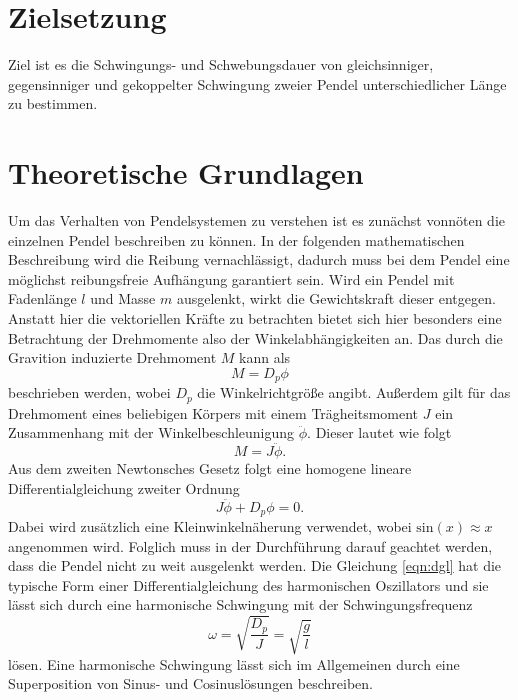 \section{Zielsetzung}

Ziel ist es die Schwingungs- und Schwebungsdauer von gleichsinniger, gegensinniger und gekoppelter Schwingung zweier Pendel unterschiedlicher Länge zu bestimmen. 

\section{Theoretische Grundlagen}
Um das Verhalten von Pendelsystemen zu verstehen ist es zunächst vonnöten die einzelnen Pendel beschreiben zu können. In der folgenden mathematischen Beschreibung wird die Reibung vernachlässigt, dadurch muss 
bei dem Pendel eine möglichst reibungsfreie Aufhängung garantiert sein. Wird ein Pendel mit Fadenlänge $l$ und Masse $m$ ausgelenkt, wirkt die Gewichtskraft dieser entgegen. Anstatt hier die vektoriellen Kräfte zu betrachten bietet 
sich hier besonders eine Betrachtung der Drehmomente also der Winkelabhängigkeiten an. Das durch die Gravition induzierte Drehmoment $M$ kann als 
\begin{equation*}
M = D_{p} \phi
\end{equation*}
beschrieben werden, wobei $D_{p}$ die Winkelrichtgröße angibt.
Außerdem gilt für das Drehmoment eines beliebigen Körpers mit einem Trägheitsmoment $J$ ein Zusammenhang mit der Winkelbeschleunigung $\ddot{\phi}$. Dieser lautet wie folgt
\begin{equation*}
M = J \ddot{\phi}.
\end{equation*}
Aus dem zweiten Newtonsches Gesetz folgt eine homogene lineare Differentialgleichung zweiter Ordnung
\begin{equation}
    \label{eqn:dgl}
J \ddot{\phi} + D_{p} \phi = 0.
\end{equation}
Dabei wird zusätzlich eine Kleinwinkelnäherung verwendet, wobei $\text{sin}(x) \approx x$ angenommen wird. Folglich muss in der Durchführung darauf geachtet werden, dass die Pendel nicht zu 
weit ausgelenkt werden.
Die Gleichung \eqref{eqn:dgl} hat die typische Form einer Differentialgleichung des harmonischen Oszillators und sie lässt sich durch eine harmonische Schwingung mit der Schwingungsfrequenz
\begin{equation*}
\omega = \sqrt{\frac{D_{p}}{J}} = \sqrt{\frac{g}{l}}
\end{equation*}
lösen. Eine harmonische Schwingung lässt sich im Allgemeinen durch eine Superposition von Sinus- und Cosinuslösungen beschreiben.
